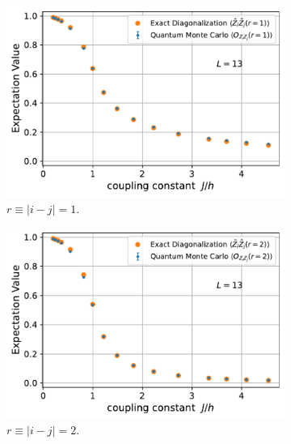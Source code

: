 \documentclass[../thesis_main.tex]{subfiles}
\begin{document}
\begin{figure}[!htb]
    \centering
    \begin{subfigure}[b]{0.45\textwidth}  %
        \centering
        \includegraphics[width=\textwidth]{images/13_site/L=13_ZZ(r=1).pdf}
        \caption{$r \equiv |i-j| = 1$.}
    \end{subfigure}
    \hspace{1em}  %
    \begin{subfigure}[b]{0.45\textwidth}
        \centering
        \includegraphics[width=\textwidth]{images/13_site/L=13_ZZ(r=2).pdf}
        \caption{$r \equiv |i-j| = 2$.}
    \end{subfigure}
    \hspace{1em}  %
    \begin{subfigure}[b]{0.45\textwidth}

\end{subfigure}
\end{figure}
\end{document}
